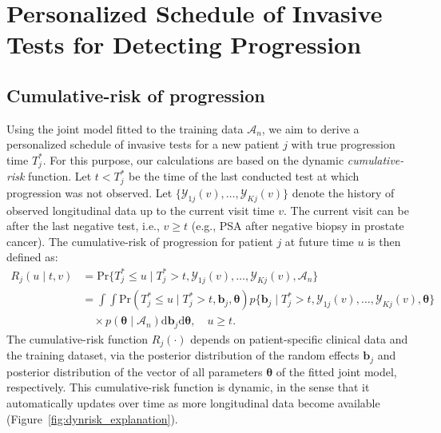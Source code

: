 \section{Personalized Schedule of Invasive Tests for Detecting Progression} 
\label{sec:schedule}

\subsection{Cumulative-risk of progression} 
\label{subsec:cum_risk}
Using the joint model fitted to the training data $\mathcal{A}_n$, we aim to derive a personalized schedule of invasive tests for a new patient $j$ with true progression time $T^*_j$. For this purpose, our calculations are based on the dynamic \emph{cumulative-risk} function. Let $t < T^*_j$ be the time of the last conducted test at which progression was not observed. Let $\{\mathcal{Y}_{1j}(v), \ldots, \mathcal{Y}_{Kj}(v)\}$ denote the history of observed longitudinal data up to the current visit time $v$. The current visit can be after the last negative test, i.e., $v \geq t$ (e.g., PSA after negative biopsy in prostate cancer). The cumulative-risk of progression for patient $j$ at future time $u$ is then defined as:
\begin{equation}
\label{eq:cumulative_risk}
\begin{split}
R_j(u \mid t, v) &= \mbox{Pr}\big\{T^*_j \leq u \mid T^*_j > t, \mathcal{Y}_{1j}(v), \ldots, \mathcal{Y}_{Kj}(v), \mathcal{A}_n\big\}\\
&=\int \int \mbox{Pr}(T^*_j \leq u \mid T^*_j > t, \boldsymbol{b}_{j}, \boldsymbol{\theta}) p\big\{\boldsymbol{b}_j \mid T^*_j > t, \mathcal{Y}_{1j}(v), \ldots, \mathcal{Y}_{Kj}(v), \boldsymbol{\theta} \big\}\\
&\quad \times p(\boldsymbol{\theta} \mid \mathcal{A}_n) \mathrm{d}\boldsymbol{b}_j \mathrm{d}\boldsymbol{\theta}, \quad u \geq t.
\end{split}
\end{equation}
The cumulative-risk function $R_j(\cdot)$ depends on patient-specific clinical data and the training dataset, via the posterior distribution of the random effects $\boldsymbol{b}_{j}$ and posterior distribution of the vector of all parameters $\boldsymbol{\theta}$ of the fitted joint model, respectively. This cumulative-risk function is dynamic, in the sense that it automatically updates over time as more longitudinal data become available (Figure~\ref{fig:dynrisk_explanation}).

